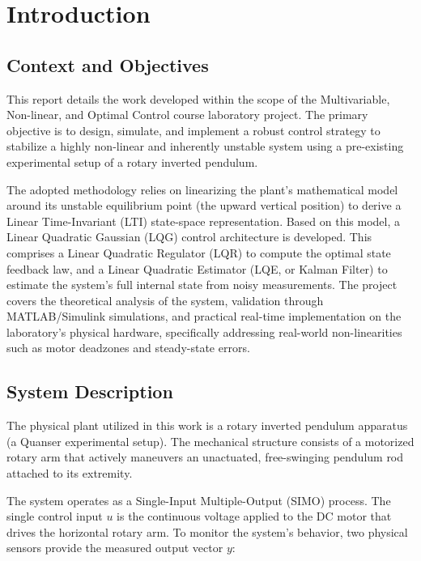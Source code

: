 \section{Introduction}

\subsection{Context and Objectives}

\par This report details the work developed within the scope of the Multivariable, Non-linear, and Optimal Control course 
laboratory project. The primary objective is to design, simulate, and implement a robust control strategy to stabilize a highly 
non-linear and inherently unstable system using a pre-existing experimental setup of a rotary inverted pendulum.

\par The adopted methodology relies on linearizing the plant's mathematical model around its unstable equilibrium point 
(the upward vertical position) to derive a Linear Time-Invariant (LTI) state-space representation. Based on this model, a 
Linear Quadratic Gaussian (LQG) control architecture is developed. This comprises a Linear Quadratic Regulator (LQR) to compute 
the optimal state feedback law, and a Linear Quadratic Estimator (LQE, or Kalman Filter) to estimate the system's full internal 
state from noisy measurements. The project covers the theoretical analysis of the system, validation through MATLAB/Simulink 
simulations, and practical real-time implementation on the laboratory's physical hardware, specifically addressing real-world 
non-linearities such as motor deadzones and steady-state errors.

\subsection{System Description}

\par The physical plant utilized in this work is a rotary inverted pendulum apparatus (a Quanser experimental setup). 
The mechanical structure consists of a motorized rotary arm that actively maneuvers an unactuated, free-swinging pendulum rod 
attached to its extremity.

\vspace{1pt}

\par The system operates as a Single-Input Multiple-Output (SIMO) process. The single control input $u$ is the continuous 
voltage applied to the DC motor that drives the horizontal rotary arm. To monitor the system's behavior, two physical sensors 
provide the measured output vector $y$:


